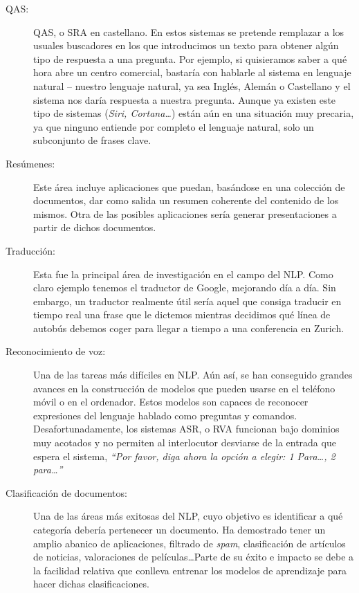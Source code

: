 \begin{description}
  \item[QAS:] \ac{QAS}, o \ac{SRA} en castellano. En estos sistemas se pretende
    remplazar a los usuales buscadores en los que introducimos un texto para
    obtener algún tipo de respuesta a una pregunta. Por ejemplo, si quisieramos
    saber a qué hora abre un centro comercial, bastaría con hablarle al sistema
    en lenguaje natural -- nuestro lenguaje natural, ya sea Inglés, Alemán o
    Castellano y el sistema nos daría respuesta a nuestra pregunta. Aunque ya
    existen este tipo de sistemas (\eg \emph{Siri, Cortana\dots}) están aún en
    una situación muy precaria, ya que ninguno entiende por completo el lenguaje
    natural, solo un subconjunto de frases clave.
  \item[Resúmenes:] Este área incluye aplicaciones que puedan, basándose en una
    colección de documentos, dar como salida un resumen coherente del contenido
    de los mismos. Otra de las posibles aplicaciones sería generar
    presentaciones a partir de dichos documentos.
  \item[Traducción:] Esta fue la principal área de investigación en el campo del
    \ac{NLP}. Como claro ejemplo tenemos el traductor de Google, mejorando día a
    día. Sin embargo, un traductor realmente útil sería aquel que consiga
    traducir en tiempo real una frase que le dictemos mientras decidimos qué
    línea de autobús debemos coger para llegar a tiempo a una conferencia en
    Zurich.
  \item[Reconocimiento de voz:] Una de las tareas más difíciles en \ac{NLP}. Aún
    así, se han conseguido grandes avances en la construcción de modelos que
    pueden usarse en el teléfono móvil o en el ordenador. Estos modelos son
    capaces de reconocer expresiones del lenguaje hablado como preguntas y
    comandos. Desafortunadamente, los sistemas \ac{ASR}, o \ac{RVA} funcionan
    bajo dominios muy acotados y no permiten al interlocutor desviarse de la
    entrada que espera el sistema, \eg \emph{``Por favor, diga ahora la opción a
      elegir: 1 Para\dots, 2 para\dots''}
  \item[Clasificación de documentos:] Una de las áreas más exitosas del
    \ac{NLP}, cuyo objetivo es identificar a qué categoría debería pertenecer un
    documento. Ha demostrado tener un amplio abanico de aplicaciones, \eg
    filtrado de \emph{spam}, clasificación de artículos de noticias,
    valoraciones de películas\dots Parte de su éxito e impacto se debe a la
    facilidad relativa que conlleva entrenar los modelos de aprendizaje para
    hacer dichas clasificaciones.
\end{description}
